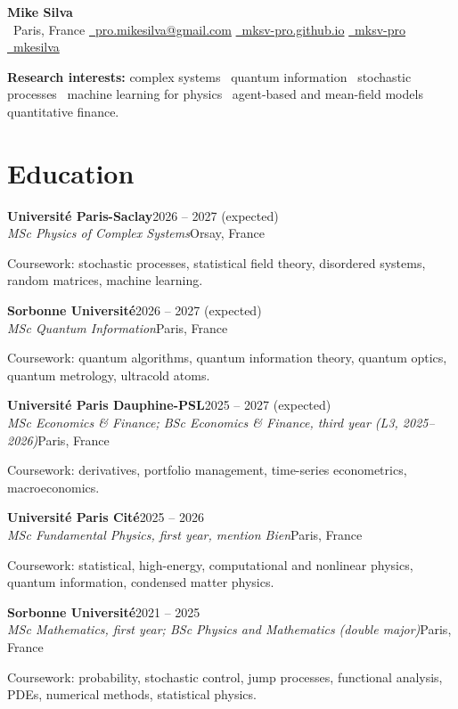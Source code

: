 \documentclass[a4paper,10pt]{article}
\newcommand{\entry}[4]{%
  \textbf{#1}\hfill #4\\
  \textit{#3}\hfill {\color{muted}#2}\par}
\newcommand{\coursework}[1]{{\small\color{muted}Coursework: #1}\par\vspace{2pt}}
\begin{document}
\begin{center}
  {\LARGE\textbf{Mike Silva}}\\[4pt]
  \small
  \newcommand{\ico}[1]{{\color{muted}#1}~}%
  \ico{\faMapMarker*}Paris, France \qquad
  \href{mailto:pro.mikesilva@gmail.com}{\ico{\faEnvelope}pro.mikesilva@gmail.com} \qquad
  \href{https://mksv-pro.github.io}{\ico{\faGlobe}mksv-pro.github.io} \qquad
  \href{https://github.com/mksv-pro}{\ico{\faGithub}mksv-pro} \qquad
  \href{https://www.linkedin.com/in/mkesilva/}{\ico{\faLinkedin}mkesilva}
\end{center}

\textbf{Research interests:} complex systems~\textperiodcentered{} quantum information~\textperiodcentered{} stochastic processes~\textperiodcentered{} machine learning for physics~\textperiodcentered{} agent-based and mean-field models~\textperiodcentered{} quantitative finance.

\section*{Education}

\entry{Université Paris-Saclay}{Orsay, France}{MSc Physics of Complex Systems}{2026 -- 2027 (expected)}
\coursework{stochastic processes, statistical field theory, disordered systems, random matrices, machine learning.}

\entry{Sorbonne Université}{Paris, France}{MSc Quantum Information}{2026 -- 2027 (expected)}
\coursework{quantum algorithms, quantum information theory, quantum optics, quantum metrology, ultracold atoms.}

\entry{Université Paris Dauphine-PSL}{Paris, France}{MSc Economics \& Finance; BSc Economics \& Finance, third year (L3, 2025–2026)}{2025 -- 2027 (expected)}
\coursework{derivatives, portfolio management, time-series econometrics, macroeconomics.}

\entry{Université Paris Cité}{Paris, France}{MSc Fundamental Physics, first year, \textit{mention Bien}}{2025 -- 2026}
\coursework{statistical, high-energy, computational and nonlinear physics, quantum information, condensed matter physics.}

\entry{Sorbonne Université}{Paris, France}{MSc Mathematics, first year; BSc Physics and Mathematics (double major)}{2021 -- 2025}
\coursework{probability, stochastic control, jump processes, functional analysis, PDEs, numerical methods, statistical physics.}
\end{document}
